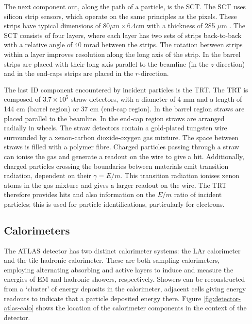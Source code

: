 The next component out, along the path of a particle, is the \ac{SCT}.
The \ac{SCT} uses silicon strip sensors, which operate on the same principles as
the pixels. These strips have typical dimensions of $80\mu\text{m}\times6.4$cm
with a thickness of 285 $\mu$m \cite{ATLASpaper}. The \ac{SCT} consists of four
layers, where each layer has two sets of strips back-to-back with a relative
angle of 40 mrad between the strips. The rotation between strips within a layer
improves resolution along the long axis of the strip. In the barrel strips are
placed with their long axis parallel to the beamline (in the $z$-direction) and
in the end-caps strips are placed in the $r$-direction.

The last \ac{ID} component encountered by incident particles is the \ac{TRT}.
The \ac{TRT} is composed of $3.7\times10^5$ straw detectors, with a diameter of
4 mm and a length of 144 cm (barrel region) or 37 cm (end-cap region).  In the
barrel region straws are placed parallel to the beamline. In the end-cap region
straws are arranged radially in wheels.  The straw detectors contain a
gold-plated tungsten wire surrounded by a xenon-carbon dioxide-oxygen gas
mixture. The space between straws is filled with a polymer fibre.
Charged particles passing through a straw can ionise the gas and generate a
readout on the wire to give a hit. Additionally, charged
particles crossing the boundaries between materials emit transition radiation,
dependent on their $\gamma = E/m$. This transition radiation ionises xenon atoms in
the gas mixture and gives a larger readout on the wire. 
The \ac{TRT} therefore provides hits and also information on the $E/m$ ratio of
incident particles; this is used for particle identifications, particularly for
electrons.


\subsection{Calorimeters}

The \ac{ATLAS} detector has two distinct calorimeter systems: the \ac{LAr}
calorimeter and the tile hadronic calorimeter. These are both sampling
calorimeters, employing alternating absorbing and active layers to induce and
measure the energies of \ac{EM} and hadronic showers, respectively. Showers can
be reconstructed from a `cluster' of energy deposits in the calorimeter,
adjacent cells giving energy readouts to indicate that a particle deposited
energy there.  Figure \ref{fig:detector-atlas-calo} shows the location of the
calorimeter components in the context of the detector.


